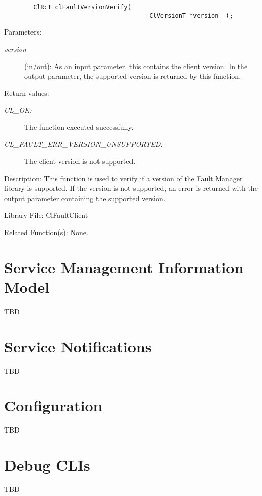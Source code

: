 \begin{flushleft}
\begin{Desc}
\footnotesize\begin{verbatim}        ClRcT clFaultVersionVerify(
                            			ClVersionT *version  );
\end{verbatim}
\normalsize
\end{Desc}
\begin{Desc}
\item[Parameters:]
\begin{description}
\item[{\em version}](in/out): As an input parameter, this contains the client version. In the output parameter, the supported version is returned
by this function.\end{description}
\end{Desc}
\begin{Desc}
\item[Return values:]
\begin{description}
\item[{\em CL\_\-OK:}]The function executed successfully. 
\item[{\em CL\_\-FAULT\_\-ERR\_\-VERSION\_\-UNSUPPORTED:}]The client version is not supported.\end{description}
\end{Desc}
\begin{Desc}
\item[Description:]This function is used to verify if a version of the Fault Manager library is supported. If the version is not supported, an 
error is returned with the output parameter containing the supported version.\end{Desc}
\begin{Desc}
\item[Library File:]Cl\-Fault\-Client\end{Desc}
\begin{Desc}
\item[Related Function(s):]None. \end{Desc}



\chapter{Service Management Information Model}
TBD

\chapter{Service Notifications}
TBD

\chapter{Configuration}
TBD

\chapter{Debug CLIs}
TBD


\end{flushleft}